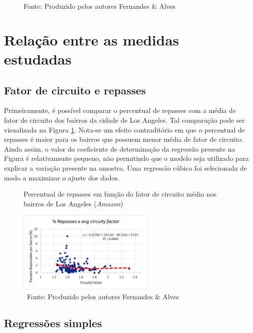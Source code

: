 \begin{figure}[H]
    \caption*{Fonte: Produzido pelos autores Fernandes \& Alves}
\end{figure}


\section{Relação entre as medidas estudadas}

\subsection{Fator de circuito e repasses}

Primeiramente, é possível comparar o percentual de repasses com a média de fator de circuito dos bairros da cidade de Los Angeles. 
Tal comparação pode ser visualizada na Figura \ref{fig:fc_regressao_LA}.
Nota-se um efeito contraditório em que o percentual de repasses é maior para os bairros que possuem menor média de fator de circuito.
Ainda assim, o valor do coeficiente de determinação da regressão presente na Figura é relativamente pequeno, não permitindo que o modelo seja utilizado para explicar a variação presente na amostra. 
Uma regressão cúbica foi selecionada de modo a maximizar o ajuste dos dados.

\begin{figure}[H]
    \centering
    \caption{Percentual de repasses em função do fator de circuito médio nos bairros de Los Angeles (\textit{Amazon})}
    \label{fig:fc_regressao_LA}
    \includegraphics[width=0.6\textwidth]{images/6_amazon/fc/repasses_x_cf_la.png}
    \caption*{\ Fonte: Produzido pelos autores Fernandes \& Alves}
\end{figure}


\subsection{Regressões simples} \label{CorrelacaoPreditorUnico}

